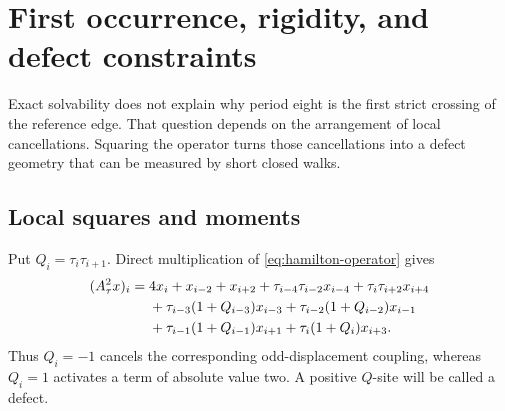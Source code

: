 \section{First occurrence, rigidity, and defect constraints}
\label{sec:first-rigidity}

Exact solvability does not explain why period eight is the first strict
crossing of the reference edge.  That question depends on the arrangement of
local cancellations.  Squaring the operator turns those cancellations into a
defect geometry that can be measured by short closed walks.

\subsection{Local squares and moments}

Put $Q_i=\tau_i\tau_{i+1}$.  Direct multiplication of
\eqref{eq:hamilton-operator} gives
\begin{align}
(A_\tau^2x)_i={}&4x_i+x_{i-2}+x_{i+2}
 +\tau_{i-4}\tau_{i-2}x_{i-4}+\tau_i\tau_{i+2}x_{i+4}\notag\\
&+\tau_{i-3}(1+Q_{i-3})x_{i-3}
 +\tau_{i-2}(1+Q_{i-2})x_{i-1}\notag\\
&+\tau_{i-1}(1+Q_{i-1})x_{i+1}
 +\tau_i(1+Q_i)x_{i+3}.
\label{eq:local-square-row}
\end{align}
Thus $Q_i=-1$ cancels the corresponding odd-displacement coupling, whereas
$Q_i=1$ activates a term of absolute value two.  A positive $Q$-site will be
called a defect.

